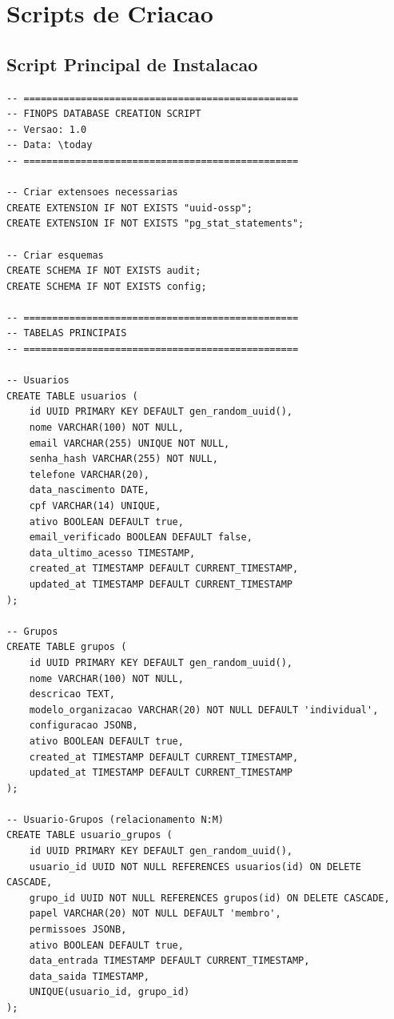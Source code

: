 \section{Scripts de Criacao}

\subsection{Script Principal de Instalacao}

\begin{lstlisting}[caption=Script completo de criacao do banco]
-- ================================================
-- FINOPS DATABASE CREATION SCRIPT
-- Versao: 1.0
-- Data: \today
-- ================================================

-- Criar extensoes necessarias
CREATE EXTENSION IF NOT EXISTS "uuid-ossp";
CREATE EXTENSION IF NOT EXISTS "pg_stat_statements";

-- Criar esquemas
CREATE SCHEMA IF NOT EXISTS audit;
CREATE SCHEMA IF NOT EXISTS config;

-- ================================================
-- TABELAS PRINCIPAIS
-- ================================================

-- Usuarios
CREATE TABLE usuarios (
    id UUID PRIMARY KEY DEFAULT gen_random_uuid(),
    nome VARCHAR(100) NOT NULL,
    email VARCHAR(255) UNIQUE NOT NULL,
    senha_hash VARCHAR(255) NOT NULL,
    telefone VARCHAR(20),
    data_nascimento DATE,
    cpf VARCHAR(14) UNIQUE,
    ativo BOOLEAN DEFAULT true,
    email_verificado BOOLEAN DEFAULT false,
    data_ultimo_acesso TIMESTAMP,
    created_at TIMESTAMP DEFAULT CURRENT_TIMESTAMP,
    updated_at TIMESTAMP DEFAULT CURRENT_TIMESTAMP
);

-- Grupos
CREATE TABLE grupos (
    id UUID PRIMARY KEY DEFAULT gen_random_uuid(),
    nome VARCHAR(100) NOT NULL,
    descricao TEXT,
    modelo_organizacao VARCHAR(20) NOT NULL DEFAULT 'individual',
    configuracao JSONB,
    ativo BOOLEAN DEFAULT true,
    created_at TIMESTAMP DEFAULT CURRENT_TIMESTAMP,
    updated_at TIMESTAMP DEFAULT CURRENT_TIMESTAMP
);

-- Usuario-Grupos (relacionamento N:M)
CREATE TABLE usuario_grupos (
    id UUID PRIMARY KEY DEFAULT gen_random_uuid(),
    usuario_id UUID NOT NULL REFERENCES usuarios(id) ON DELETE CASCADE,
    grupo_id UUID NOT NULL REFERENCES grupos(id) ON DELETE CASCADE,
    papel VARCHAR(20) NOT NULL DEFAULT 'membro',
    permissoes JSONB,
    ativo BOOLEAN DEFAULT true,
    data_entrada TIMESTAMP DEFAULT CURRENT_TIMESTAMP,
    data_saida TIMESTAMP,
    UNIQUE(usuario_id, grupo_id)
);


\end{lstlisting}

